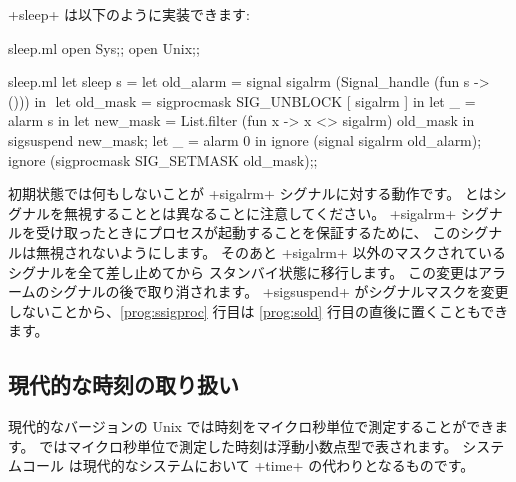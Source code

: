 \begin{example} %
\ml+sleep+ は以下のように実装できます:
%
\begin{codefile}{sleep.ml}
open Sys;;
open Unix;;
\end{codefile}
%
\begin{listingcodefile}[style=numbers]{sleep.ml}
let sleep s =
  let old_alarm = signal sigalrm (Signal_handle (fun s -> ())) in $\label{prog:sold}$
  let old_mask = sigprocmask SIG_UNBLOCK [ sigalrm ] in
  let _ = alarm s in
  let new_mask = List.filter (fun x -> x <> sigalrm) old_mask in
  sigsuspend new_mask;
  let _ = alarm 0 in
  ignore (signal sigalrm old_alarm);
  ignore (sigprocmask SIG_SETMASK old_mask)$\label{prog:ssigproc}$;;
\end{listingcodefile}
%
初期状態では何もしないことが \ml+sigalrm+ シグナルに対する動作です。
 とはシグナルを無視することとは異なることに注意してください。
\ml+sigalrm+ シグナルを受け取ったときにプロセスが起動することを保証するために、
このシグナルは無視されないようにします。
そのあと \ml+sigalrm+ 以外のマスクされているシグナルを全て差し止めてから
スタンバイ状態に移行します。
この変更はアラームのシグナルの後で取り消されます。
\ml+sigsuspend+ がシグナルマスクを変更しないことから、\ref{prog:ssigproc} 行目は
\ref{prog:sold} 行目の直後に置くこともできます。
\end{example}

\subsection*{現代的な時刻の取り扱い}

現代的なバージョンの Unix では時刻をマイクロ秒単位で測定することができます。
\ocaml ではマイクロ秒単位で測定した時刻は浮動小数点型で表されます。
システムコール  は現代的なシステムにおいて \ml+time+ の代わりとなるものです。

